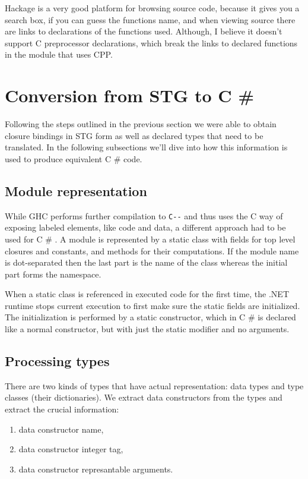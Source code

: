 \documentclass[en]{pracamgr}
\newcommand{\shrp}{%
  {\fontfamily{ppl}\selectfont\#%
  }}
\begin{document}
Hackage is a very good platform for browsing source code,
because it gives you a search box, if you can guess the
functions name, and when viewing source there are links
to declarations of the functions used. Although, I believe it doesn't
support C preprocessor declarations, which break the links
to declared functions in the module that uses CPP.

\section{Conversion from STG to C\shrp{}}
Following the steps outlined in the previous section
we were able to obtain closure bindings in STG form
as well as declared types that need to be translated.
In the following subsections we'll dive into how
this information is used to produce equivalent C\shrp{} code.

\subsection{Module representation}
While GHC performs further compilation to \verb|C--| and
thus uses the C way of exposing labeled elements,
like code and data, a different approach had to be
used for C\shrp{}.
A module is represented by a static class with fields
for top level closures and constants, and methods
for their computations. If the module name is dot-separated
then the last part is the name of the class whereas the
initial part forms the namespace.

When a static class is referenced in executed code
for the first time, the .NET runtime stops current execution
to first make sure the static fields are initialized.
The initialization is performed by a static constructor,
which in C\shrp{} is declared like a normal constructor,
but with just the static modifier and no arguments.

\subsection{Processing types}
There are two kinds of types that have actual representation:
data types and type classes (their dictionaries).
We extract data constructors from the types and
extract the crucial information:

\begin{enumerate}
    \item data constructor name,
    \item data constructor integer tag,
    \item data constructor represantable arguments.
\end{enumerate}
\end{document}
